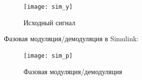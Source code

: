 \documentclass[10pt,a4paper]{article}
\begin{document}
\begin{figure}[h]\centering
    \texttt{[image: sim\_y]} 
    \caption{Исходный сигнал}\label{fig.sim_y}
\end{figure}                                                                                                                                                                                                                                                                                                                                                                                                                                                                                                                                                                                                                                                                                                                                                                                                                                                                                                                                                                                                                                                                                                                                                                                                                                                                                                                                                                                                                                                                       
\FloatBarrier

Фазовая модуляция/демодуляция в Simulink:
\begin{figure}[h]\centering
    \texttt{[image: sim\_p]} 
    \caption{Фазовая модуляция/демодуляция}\label{fig.sim_p}
\end{figure}                                                                                                                                                                                                                                                                                                                                                                                                                                                                                                                                                                                                                                                                                                                                                                                                                                                                                                                                                                                                                                                                                                                                                                                                                                                                                                                                                                                                                                                                       
\end{document}
